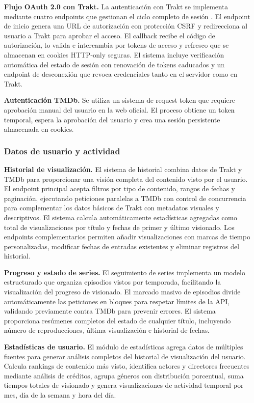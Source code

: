 \textbf{Flujo OAuth 2.0 con Trakt.} La autenticación con Trakt se implementa mediante cuatro endpoints que gestionan el ciclo completo de sesión \parencite{NextJS:2024,OWASP:2021}. El endpoint de inicio genera una URL de autorización con protección CSRF y redirecciona al usuario a Trakt para aprobar el acceso. El callback recibe el código de autorización, lo valida e intercambia por tokens de acceso y refresco que se almacenan en cookies HTTP-only seguras. El sistema incluye verificación automática del estado de sesión con renovación de tokens caducados y un endpoint de desconexión que revoca credenciales tanto en el servidor como en Trakt.

\textbf{Autenticación TMDb.} Se utiliza un sistema de request token que requiere aprobación manual del usuario en la web oficial. El proceso obtiene un token temporal, espera la aprobación del usuario y crea una sesión persistente almacenada en cookies.

\subsubsection{Datos de usuario y actividad}

\textbf{Historial de visualización.} El sistema de historial combina datos de Trakt y TMDb para proporcionar una visión completa del contenido visto por el usuario. El endpoint principal acepta filtros por tipo de contenido, rangos de fechas y paginación, ejecutando peticiones paralelas a TMDb con control de concurrencia para complementar los datos básicos de Trakt con metadatos visuales y descriptivos. El sistema calcula automáticamente estadísticas agregadas como total de visualizaciones por título y fechas de primer y último visionado. Los endpoints complementarios permiten añadir visualizaciones con marcas de tiempo personalizadas, modificar fechas de entradas existentes y eliminar registros del historial.

\textbf{Progreso y estado de series.} El seguimiento de series implementa un modelo estructurado que organiza episodios vistos por temporada, facilitando la visualización del progreso de visionado. El marcado masivo de episodios divide automáticamente las peticiones en bloques para respetar límites de la API, validando previamente contra TMDb para prevenir errores. El sistema proporciona resúmenes completos del estado de cualquier título, incluyendo número de reproducciones, última visualización e historial de fechas.

\textbf{Estadísticas de usuario.} El módulo de estadísticas agrega datos de múltiples fuentes para generar análisis completos del historial de visualización del usuario. Calcula rankings de contenido más visto, identifica actores y directores frecuentes mediante análisis de créditos, agrupa géneros con distribución porcentual, suma tiempos totales de visionado y genera visualizaciones de actividad temporal por mes, día de la semana y hora del día.


